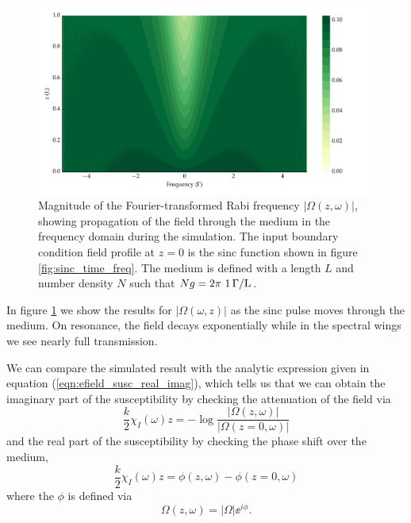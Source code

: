     \begin{figure}[]
    \includegraphics[width=\linewidth]
      {figs/02_propagation/two_mb_solve_f03_fig1.pdf}
    \caption{
    Magnitude of the Fourier-transformed Rabi frequency $\lvert \Omega(z,\omega)
    \rvert$, showing propagation of the field through the medium in the
    frequency domain during the simulation. The input boundary condition field
    profile at $z=0$ is the sinc function shown in figure
    \ref{fig:sinc_time_freq}. The medium is defined with a length $L$ and number
    density $N$ such that  $Ng = \unit[2\pi~1]{\Gamma /L}$.
    }
    \label{fig:sinc_freq_zt}
    \end{figure}

    In figure \ref{fig:sinc_freq_zt} we show the results for $\lvert
    \Omega(\omega, z) \rvert$ as the sinc pulse moves through the medium. On resonance, the field decays exponentially while in the spectral wings we see nearly full transmission.

    We can compare the simulated result with the analytic expression given in
    equation  (\ref{eqn:efield_susc_real_imag}), which tells us that we can
    obtain  the imaginary part of the susceptibility by checking the attenuation
    of the field via
    \begin{equation}\label{eqn:chi_im_sim}
      \frac{k}{2} \chi_I(\omega) z = -\log{\frac{\lvert \Omega(z, \omega) \rvert}{\lvert \Omega(z=0, \omega) \rvert}}
    \end{equation}
    and the real part of the susceptibility by checking the phase shift over the medium,
    \begin{equation}\label{eqn:chi_re_sim}
      \frac{k}{2} \chi_I(\omega) z = \phi(z, \omega) - \phi(z=0, \omega)
    \end{equation}
    where the $\phi$ is defined via
    \begin{equation}
      \Omega(z, \omega) = \lvert \Omega \rvert \ee^{i \phi}.
    \end{equation}

